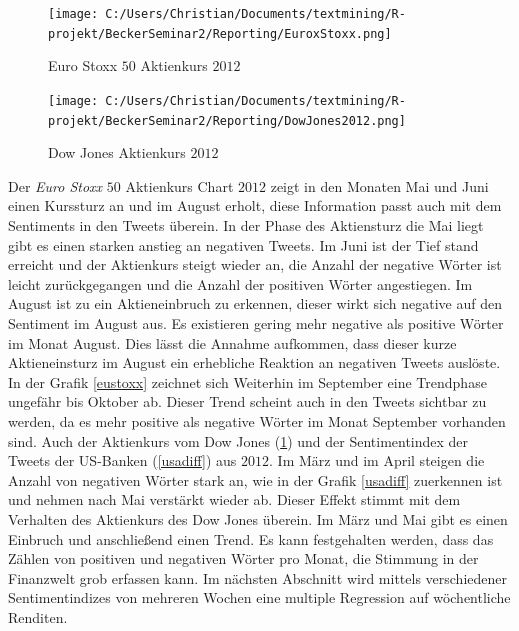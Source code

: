  \begin{figure}[H]
 \begin{minipage}[b]{.4\linewidth} %
 	\texttt{[image: C:/Users/Christian/Documents/textmining/R-projekt/BeckerSeminar2/Reporting/EuroxStoxx.png]}
 	\caption{Euro Stoxx $50$ Aktienkurs $2012$} \label{eustoxx}
 \end{minipage}
 \hspace{.1\linewidth}%
 \begin{minipage}[b]{.4\linewidth} %
 	\texttt{[image: C:/Users/Christian/Documents/textmining/R-projekt/BeckerSeminar2/Reporting/DowJones2012.png]}
 	\caption{Dow Jones Aktienkurs $2012$}\label{dowjones}
 \end{minipage}
\end{figure}
Der \textit{Euro Stoxx} $50$ Aktienkurs Chart $2012$ zeigt in den Monaten Mai und Juni einen Kurssturz an und im August erholt, diese Information passt auch mit dem Sentiments in den Tweets überein. In der Phase des Aktiensturz  die Mai liegt gibt es einen starken anstieg an negativen Tweets. Im Juni ist der Tief stand erreicht und der Aktienkurs steigt wieder an, die Anzahl der negative Wörter ist leicht zurückgegangen und die Anzahl der positiven Wörter angestiegen. Im August ist zu ein Aktieneinbruch zu erkennen, dieser wirkt sich negative auf den Sentiment im August aus. Es existieren gering mehr negative als positive Wörter im Monat August. Dies lässt die Annahme aufkommen, dass dieser kurze Aktieneinsturz im August ein erhebliche Reaktion an negativen Tweets auslöste. In der Grafik \ref{eustoxx} zeichnet sich Weiterhin im September eine Trendphase ungefähr bis Oktober ab. Dieser Trend scheint auch in den Tweets sichtbar zu werden, da es mehr positive als negative Wörter im Monat September vorhanden sind. Auch der Aktienkurs vom Dow Jones (\ref{dowjones}) und der Sentimentindex der Tweets der US-Banken (\ref{usadiff}) aus $2012$. Im März und im April steigen die Anzahl von negativen Wörter stark an, wie in der Grafik \ref{usadiff} zuerkennen ist und nehmen nach Mai verstärkt wieder ab. Dieser Effekt stimmt mit dem Verhalten des Aktienkurs des Dow Jones überein. Im März und Mai gibt es einen Einbruch und anschließend einen Trend. Es kann festgehalten werden, dass das Zählen von positiven und negativen Wörter pro Monat, die Stimmung in der Finanzwelt grob erfassen kann. Im nächsten Abschnitt wird mittels verschiedener Sentimentindizes von mehreren Wochen eine multiple Regression auf wöchentliche Renditen.
